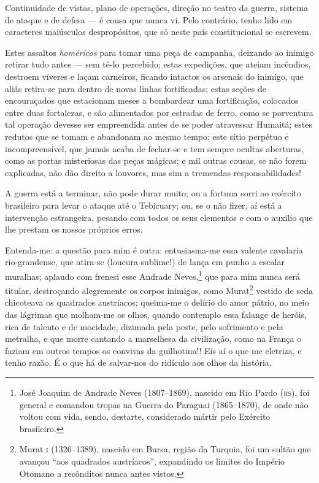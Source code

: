 Continuidade de vistas, plano de operações, direção no teatro da guerra,
sistema de ataque e de defesa --- é cousa que nunca vi. Pelo contrário,
tenho lido em caracteres maiúsculos despropósitos, que só neste país
constitucional se escrevem.

Estes assaltos \emph{homéricos} para tomar uma peça de campanha,
deixando ao inimigo retirar tudo antes --- sem tê-lo percebido; estas
expedições, que ateiam incêndios, destroem víveres e laçam carneiros,
ficando intactos os arsenais do inimigo, que aliás retira-se para dentro
de novas linhas fortificadas; estas seções de encouraçados que
estacionam meses a bombardear uma fortificação, colocados entre duas
fortalezas, e são alimentados por estradas de ferro, como se porventura
tal operação devesse ser empreendida antes de se poder atravessar
Humaitá; estes redutos que se tomam e abandonam ao mesmo tempo; este
sítio perpétuo e incompreensível, que jamais acaba de fechar-se e tem
sempre ocultas aberturas, como as portas misteriosas das peças mágicas;
e mil outras cousas, se não forem explicadas, não dão direito a
louvores, mas sim a tremendas responsabilidades!

A guerra está a terminar, não pode durar muito; ou a fortuna sorri ao
exército brasileiro para levar o ataque até o Tebicuary; ou, se o não
fizer, aí está a intervenção estrangeira, pesando com todos os seus
elementos e com o auxílio que lhe prestam os nossos próprios erros.

Entenda-me: a questão para mim é outra: entusiasma-me essa valente
cavalaria rio-grandense, que atira-se (loucura sublime!) de lança em
punho a escalar muralhas; aplaudo com frenesi esse Andrade
Neves,\footnote{José Joaquim de Andrade Neves (1807--1869), nascido em
  Rio Pardo (\textsc{rs}), foi general e comandou tropas na Guerra do Paraguai
  (1865--1870), de onde não voltou com vida, sendo, destarte, considerado
  mártir pelo Exército brasileiro.} que para mim nunca será titular,
destroçando alegremente os corpos inimigos, como Murat\footnote{Murat
  \textsc{i} (1326--1389), nascido em Bursa, região da Turquia, foi um sultão que
  avançou ``aos quadrados austríacos'', expandindo os limites do Império
  Otomano a recônditos nunca antes vistos.} vestido de seda chicoteava
os quadrados austríacos; queima-me o delírio do amor pátrio, no meio das
lágrimas que molham-me os olhos, quando contemplo essa falange de
heróis, rica de talento e de mocidade, dizimada pela peste, pelo
sofrimento e pela metralha, e que morre cantando a marselhesa da
civilização, como na França o faziam em outros tempos os convivas da
guilhotina!! Eis aí o que me eletriza, e tenho razão. É o que há de
salvar-nos do ridículo aos olhos da história.

